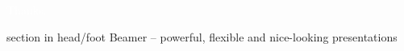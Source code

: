 \documentclass[aspectratio=169,utf8]{ctexbeamer}
\begin{document}
\addtocounter{framenumber}{-1}


\begin{frame}[plain, b]
  \centering
  \Large \textcolor{white}{Thanks.}
  \normalsize

  \vspace*{\fill}

  \begin{beamercolorbox}[wd=\paperwidth]{section in head/foot}
    \centering
    \vskip3pt
    {\small Beamer -- powerful, flexible and nice-looking presentations}
    \vskip8pt
  \end{beamercolorbox}
  
\end{frame}
\end{document}
